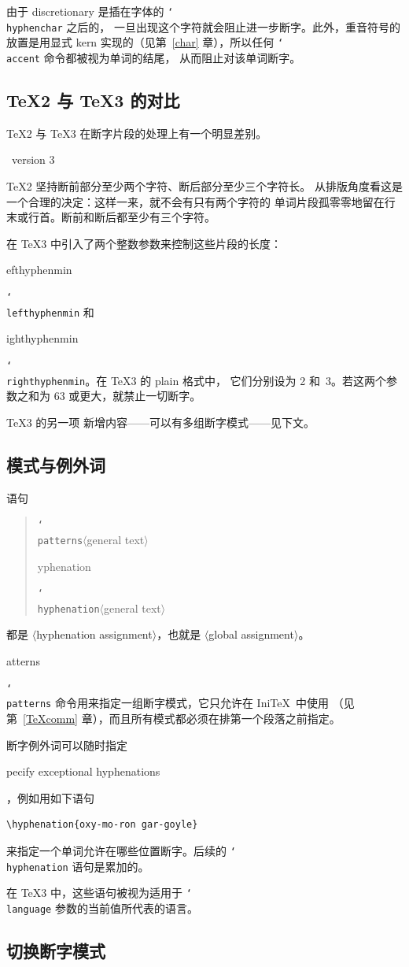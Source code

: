 \documentclass[a4paper]{rapport3}
\makeatletter
\def\nl{\protect\\}\def\n#1{{\tt #1}}\def\cs#1{{\tt\char`\\#1}}\let\csc\cs
\def\gr#1{$\langle$#1$\rangle$}\def\key#1{{\tt#1}}
\def\IniTeX{Ini\TeX}\def\LamsTeX{LAMS\TeX}\def\VirTeX{Vir\TeX}
\newenvironment{disp}{\begin{quotation}}{\end{quotation}}
\def\term#1\par{\index{#1}}
\def\howto#1\par{}
\def\cstoidx#1\par{\index{#1@\cs{#1}}}
\def\csidx#1{\cstoidx #1\par\cs{#1}}
\makeatother
\begin{document}
由于 discretionary 是插在字体的 \cs{hyphenchar} 之后的，
一旦出现这个字符就会阻止进一步断字。此外，重音符号的放置是用显式 kern
实现的（见第~\ref{char} 章），所以任何 \cs{accent} 命令都被视为单词的结尾，
从而阻止对该单词断字。

\subsection{\TeX2 与 \TeX3 的对比}

\TeX2 与 \TeX3 在断字片段的处理上有一个明显差别。
\term \TeX\ version 3\par
\TeX2 坚持断前部分至少两个字符、断后部分至少三个字符长。
从排版角度看这是一个合理的决定：这样一来，就不会有只有两个字符的
单词片段孤零零地留在行末或行首。断前和断后都至少有三个字符。

在 \TeX3 中引入了两个整数参数来控制这些片段的长度：
\csidx{lefthyphenmin} 和 \csidx{righthyphenmin}。在 \TeX3 的 plain 格式中，
它们分别设为 2 和~3。若这两个参数之和为 63 或更大，就禁止一切断字。

\TeX3 的另一项 新增内容——可以有多组断字模式——见下文。

\subsection{模式与例外词}

语句 \begin{disp}\cs{patterns}\gr{general text}\nl
\csidx{hyphenation}\gr{general text}\end{disp}
都是 \gr{hyphenation assignment}，也就是 \gr{global assignment}。
\csidx{patterns} 命令用来指定一组断字模式，它只允许在 \IniTeX\ 中使用
（见第~\ref{TeXcomm} 章），而且所有模式都必须在排第一个段落之前指定。

断字例外词可以随时指定
\howto Specify exceptional hyphenations\par
，例如用如下语句
\begin{verbatim}
\hyphenation{oxy-mo-ron gar-goyle}
\end{verbatim}
来指定一个单词允许在哪些位置断字。后续的 \cs{hyphenation} 语句是累加的。

在 \TeX3 中，这些语句被视为适用于 \cs{language} 参数的当前值所代表的语言。

\subsection{切换断字模式}
\end{document}
